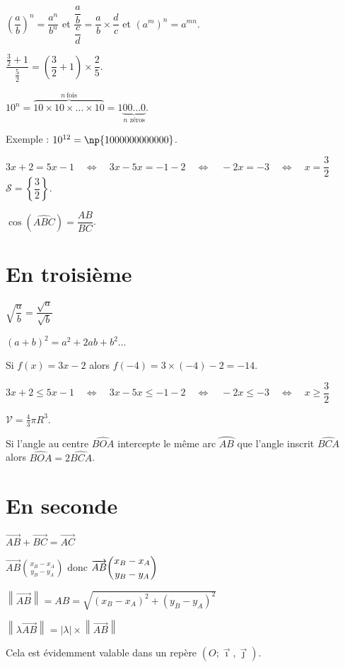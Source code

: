 \documentclass[10pt,french]{article}
\begin{document}
$\left(\dfrac a b\right)^n = \dfrac{a^n}{b^n}$ \quad et \quad
$\dfrac{\dfrac a b}{\dfrac c d} = \dfrac a b \times \dfrac d c$
\quad et \quad $\left(a^m\right)^n = a^{mn}$.\medskip

$\dfrac{\frac 32 + 1}{\frac 5 2} = \left(\dfrac 32 + 1\right) \times \dfrac 25$.\medskip

$10^n = \overbrace{10 \times 10 \times \dots \times 10}^{n\ \text{fois}}
    = 1\underbrace{00\dots0}_{n \text{ zéros}}.$\par\medskip
Exemple : $10^{12} = \np{1000000000000}$.\medskip

$3x + 2 = 5x - 1 \quad \Leftrightarrow \quad 3x - 5x = -1 -2
\quad \Leftrightarrow \quad -2x = -3
\quad \Leftrightarrow \quad  x = \dfrac 32$ \quad
$\mathcal S = \left\{\dfrac 32\right\}.$\medskip

$\cos\left(\widehat{ABC}\right) = \dfrac{AB}{BC}$.

\section{En troisième}

$\sqrt{\dfrac a b} = \dfrac{\sqrt a}{\sqrt b}$\medskip

$(a + b)^2 = a^2 + 2ab + b^2\dots$\medskip

Si $f(x) = 3x -2$ alors $f(-4) = 3 \times (-4) - 2 = -14$.\medskip

$3x + 2 \leqslant 5x - 1 \quad \Leftrightarrow \quad 3x - 5x \leqslant -1 -2
\quad \Leftrightarrow \quad -2x \leqslant -3
\quad \Leftrightarrow \quad  x \geqslant \dfrac 32$\medskip

$\mathcal V = \frac4 3 \pi R^3$.\medskip

Si l'angle au centre $\widehat{BOA}$ intercepte le même arc $\wideparen{AB}$
que l'angle inscrit $\widehat{BCA}$ alors $\widehat{BOA} = 2\widehat{BCA}$.

\section{En seconde}

$\overrightarrow{AB} + \overrightarrow{BC} = \overrightarrow{AC}$\medskip

$\overrightarrow{AB}\binom{x_B - x_A}{y_B - y_A}$ \quad donc \quad
$\overrightarrow{AB}\dbinom{x_B - x_A}{y_B - y_A}$\par\medskip
$\left\lVert \overrightarrow{AB} \right\rVert = AB = \sqrt{(x_B - x_A)^2 + (y_B - y_A)^2}$\par\medskip
$\left\lVert \lambda \overrightarrow{AB}\right\rVert =
\left\lvert \lambda \right\rvert \times \left\lVert \overrightarrow{AB}\right\rVert$\par\medskip
Cela est évidemment valable dans un repère
$\left(O ; \overrightarrow\imath, \overrightarrow\jmath\right)$.\medskip
\end{document}
